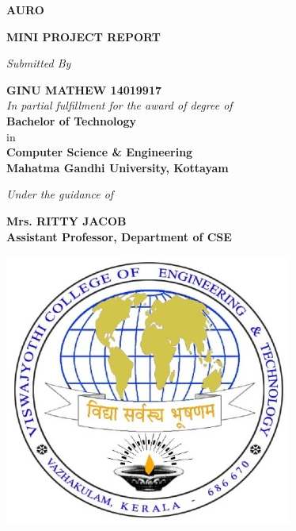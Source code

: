 \documentclass[11pt]{report}
\begin{document}
\begin{titlepage}
    \begin{center}
        
        \Huge
        \textbf{AURO}
        
        \vspace{1cm}
        \large \textbf{MINI PROJECT REPORT}
        
        \vspace{.4cm}
		\textit{Submitted By}
		
		\vspace{.4cm}      
        \large \textbf{GINU MATHEW \hspace{.5cm} 14019917}\\
        
        \vspace{.6cm}
        \textit{In partial fulfillment for the award of degree of} \\
        
        \vspace{.4cm}
        \large \textbf{Bachelor of Technology}\\
        \vspace{.4cm}
        in \\
        \vspace{.4cm}
        \large \textbf{Computer Science \& Engineering} \\
        \vspace{0.1cm}
		\large \textbf{Mahatma Gandhi University, Kottayam}
        
		\vspace{0.4cm}
		\textit{Under the guidance of}
		
		\vspace{0.4cm}
		\large\textbf{Mrs. RITTY JACOB\\ Assistant Professor, Department of CSE}       
        
        \vspace{0.4cm}
        
        \includegraphics{vjcet.jpg}
        

\end{center}
\end{titlepage}
\end{document}

